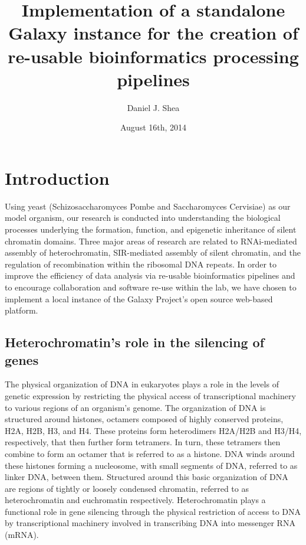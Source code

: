 \documentclass[a4paper,10pt]{article}
\title{Implementation of a standalone Galaxy instance for the creation of re-usable bioinformatics processing pipelines}
\author{Daniel J. Shea}
\date{August 16th, 2014}
\begin{document}
\maketitle
\pagebreak
\section{Introduction}
Using yeast (Schizosaccharomyces Pombe and Saccharomyces Cervisiae) as our model organism, our research is conducted into understanding the biological processes underlying the formation, function, and epigenetic inheritance of silent chromatin domains.  Three major areas of research are related to RNAi-mediated assembly of heterochromatin, SIR-mediated assembly of silent chromatin, and the regulation of recombination within the ribosomal DNA repeats.  In order to improve the efficiency of data analysis via re-usable bioinformatics pipelines and to encourage collaboration and software re-use within the lab, we have chosen to implement a local instance of the Galaxy Project's open source web-based platform.

\subsection{Heterochromatin's role in the silencing of genes}
The physical organization of DNA in eukaryotes plays a role in the levels of genetic expression by restricting the physical access of transcriptional machinery to various regions of an organism's genome.  The organization of DNA is structured around histones, octamers composed of highly conserved proteins, H2A, H2B, H3, and H4.  These proteins form heterodimers H2A/H2B and H3/H4, respectively, that then further form tetramers.  In turn, these tetramers then combine to form an octamer that is referred to as a histone.  DNA winds around these histones forming a nucleosome, with small segments of DNA, referred to as linker DNA, between them.  Structured around this basic organization of DNA are regions of tightly or loosely condensed chromatin, referred to as heterochromatin and euchromatin respectively.  Heterochromatin plays a functional role in gene silencing through the physical restriction of access to DNA by transcriptional machinery involved in transcribing DNA into messenger RNA (mRNA).
\end{document}
